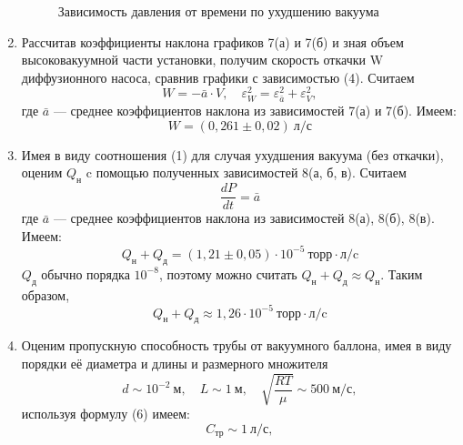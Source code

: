 \documentclass[12pt,a4paper]{article}
\begin{document}
\begin{enumerate}
    \begin{figure}[!h]
        \begin{center}
        \end{center}
        \caption{Зависимость давления от времени по ухудшению вакуума}
    \end{figure}
    \item
    Рассчитав коэффициенты наклона графиков 7(а) и 7(б) и зная объем высоковакуумной части установки, получим скорость откачки W диффузионного насоса, сравнив графики с зависимостью (4). Считаем $$W = -\bar{a}\cdot V, \quad\varepsilon_W^2 = \varepsilon_{\bar{a}}^2 + \varepsilon_V^2, $$  где $\bar{a}$ --- среднее коэффициентов наклона из зависимостей 7(а) и 7(б). Имеем:
    $$W = (0,261\pm0,02) ~\text{л/с}$$
    \item
    Имея в виду соотношения (1) для случая ухудшения вакуума (без откачки), оценим $Q_\text{н}$ c помощью полученных зависимостей 8(а, б, в). Считаем $$\frac{dP}{dt} = \bar{a}$$ где $\bar{a}$ --- среднее коэффициентов наклона из зависимостей 8(а), 8(б), 8(в). Имеем:
    $$Q_\text{н} + Q_\text{д} = (1,21\pm0,05)\cdot 10^{-5} ~\text{торр}\cdot\text{л/c}$$
    $Q_\text{д}$ обычно порядка $10^{-8}$, поэтому можно считать $Q_\text{н} + Q_\text{д} \approx Q_\text{н}$. Таким образом,
    $$Q_\text{н} + Q_\text{д} \approx 1,26\cdot 10^{-5} ~\text{торр}\cdot\text{л/c}$$
    \item Оценим пропускную способность трубы от вакуумного баллона, имея в виду порядки её диаметра и длины и размерного множителя $$d \sim 10^{-2}~\text{м},\quad L \sim 1 ~\text{м},\quad \sqrt{\frac{RT}{\mu}} \sim 500 ~\text{м/с},$$ используя формулу (6) имеем:
    $$C_\text{тр} \sim 1 ~\text{л/с},$$
\end{enumerate}
\end{document}
